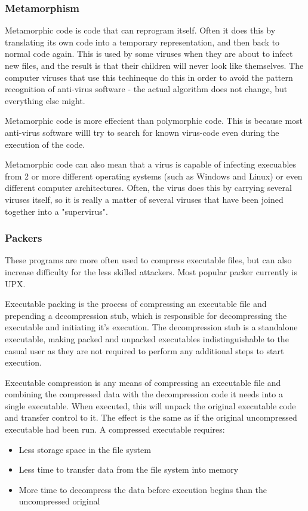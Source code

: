 \documentclass[a4paper,12pt]{article}
\begin{document}
\subsubsection{Metamorphism}
    Metamorphic code is code that can reprogram itself. Often it does this by
    translating its own code into a temporary representation, and then back
    to normal code again. This is used by some viruses when they are about to
    infect new files, and the result is that their children will never look
    like themselves. The computer viruses that use this techineque do this in
    order to avoid the pattern recognition of anti-virus software - the actual
    algorithm does not change, but everything else might.

    Metamorphic code is more effecient than polymorphic code. This is because
    most anti-virus software willl try to search for known virus-code even
    during the execution of the code.

    Metamorphic code can also mean that a virus is capable of infecting
    execuables from 2 or more different operating systems (such as Windows and
    Linux) or even different computer architectures. Often, the virus does
    this by carrying several viruses itself, so it is really a matter of
    several viruses that have been joined together into a "supervirus".

\subsubsection{Packers}
    These programs are more often used to compress
    executable files, but can also increase difficulty for the less skilled
    attackers. Most popular packer currently is UPX.

    Executable packing is the process of compressing an executable file and
    prepending a decompression stub, which is responsible for decompressing
    the executable and initiating it's execution. The decompression stub is a
    standalone executable, making packed and unpacked executables
    indistinguishable to the casual user as they are not required to perform
    any additional steps to start execution.
    
    Executable compression is any means of compressing an executable file and
    combining the compressed data with the decompression code it needs into a
    single executable. When executed, this will unpack the original executable
    code and transfer control to it. The effect is the same as if the original
    uncompressed executable had been run. A compressed executable requires:
    \begin{itemize}
    \item Less storage space in the file system
    \item Less time to transfer data from the file system into memory
    \item More time to decompress the data before execution begins than the
        uncompressed original
    \end{itemize}
\end{document}
